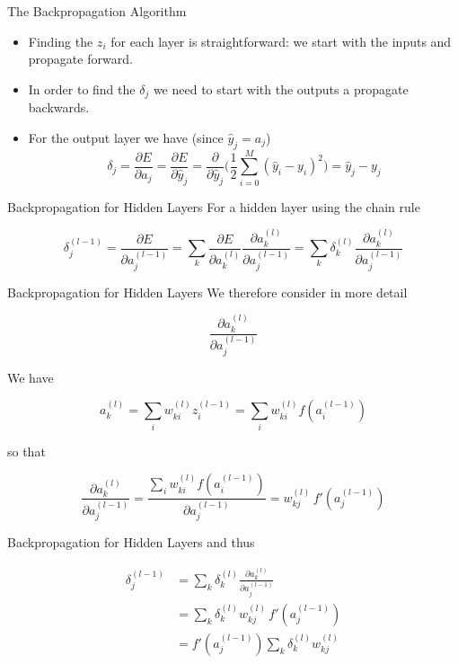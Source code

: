 \documentclass{beamer}
\begin{document}
\begin{frame}[fragile]{The Backpropagation Algorithm}
\begin{itemize}
\item
Finding the $z_i$ for each layer is straightforward: we start with the
inputs and propagate forward.
\item
In order to find the $\delta_j$ we need
to start with the outputs a propagate backwards.
\item
For the output layer we have (since $\hat{y}_j = a_j$)
$$
\delta_j = \frac{\partial E}{\partial a_j} = \frac{\partial E}{\partial \hat{y}_j} = \frac{\partial}{\partial \hat{y}_j}\bigg(\frac{1}{2}\sum_{i=0}^M (\hat{y}_i - y_i)^2\bigg) = \hat{y}_j - y_j
$$
\end{itemize}
\end{frame}

\begin{frame}[fragile]{Backpropagation for Hidden Layers}
For a hidden layer using the chain rule

$$
\delta_j^{(l-1)} = \frac{\partial E}{\partial a_j^{(l-1)}} =
\sum_k \frac{\partial E}{\partial a_k^{(l)}}\frac{\partial
  a_k^{(l)}}{\partial a_j^{(l-1)}} =
\sum_k \delta_k^{(l)}\frac{\partial a_k^{(l)}}{\partial a_j^{(l-1)}}
$$
\end{frame}

\begin{frame}[fragile]{Backpropagation for Hidden Layers}
We therefore consider in more detail

$$
\frac{\partial a_k^{(l)}}{\partial a_j^{(l-1)}}
$$

We have

$$
a_k^{(l)} = \sum_i w_{ki}^{(l)}z_i^{(l-1)} = \sum_i w_{ki}^{(l)} f(a_i^{(l-1)})
$$

so that

$$
\frac{\partial a_k^{(l)}}{\partial a_j^{(l-1)}} =
\frac{\sum_i w_{ki}^{(l)} f(a_i^{(l-1)})}{\partial a_j^{(l-1)}} =
w_{kj}^{(l)}\,f'(a_j^{(l-1)})
$$
\end{frame}

\begin{frame}[fragile]{Backpropagation for Hidden Layers}
and thus

$$
\begin{aligned}
\delta_j^{(l-1)} &=
\sum_k \delta_k^{(l)}\frac{\partial
  a_k^{(l)}}{\partial a_j^{(l-1)}} \\
&= \sum_k \delta_k^{(l)} w_{kj}^{(l)}\, f'(a_j^{(l-1)}) \\
&= f'(a_j^{(l-1)}) \sum_k \delta_k^{(l)} w_{kj}^{(l)}
\end{aligned}
$$
\end{frame}
\end{document}
